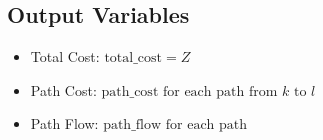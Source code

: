 \documentclass{article}
\begin{document}
\subsection*{Output Variables}
\begin{itemize}
    \item Total Cost: \( \text{total\_cost} = Z \)
    \item Path Cost: \( \text{path\_cost} \text{ for each path from } k \text{ to } l \)
    \item Path Flow: \( \text{path\_flow} \text{ for each path} \)
\end{itemize}
\end{document}
